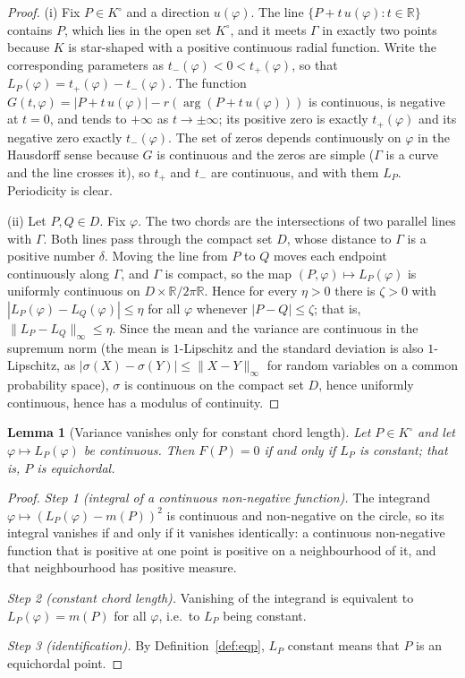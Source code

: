 \documentclass[11pt]{article}
\newcommand{\R}{\mathbb{R}}
\newtheorem{lemma}[theorem]{Lemma}
\theoremstyle{definition}
\theoremstyle{remark}
\begin{document}
\begin{proof}
(i) Fix $P\in K^\circ$ and a direction $u(\varphi)$. The line $\{P+t\,u(\varphi):t\in\R\}$ contains $P$, which lies
in the open set $K^\circ$, and it meets $\Gamma$ in exactly two points because $K$ is star-shaped with a positive
continuous radial function. Write the corresponding parameters as $t_-(\varphi)<0<t_+(\varphi)$, so that
$L_P(\varphi)=t_+(\varphi)-t_-(\varphi)$. The function $G(t,\varphi)=|P+t\,u(\varphi)|-r(\arg(P+t\,u(\varphi)))$ is
continuous, is negative at $t=0$, and tends to $+\infty$ as $t\to\pm\infty$; its positive zero is exactly
$t_+(\varphi)$ and its negative zero exactly $t_-(\varphi)$. The set of zeros depends continuously on $\varphi$ in
the Hausdorff sense because $G$ is continuous and the zeros are simple ($\Gamma$ is a curve and the line crosses
it), so $t_+$ and $t_-$ are continuous, and with them $L_P$. Periodicity is clear.

(ii) Let $P,Q\in D$. Fix $\varphi$. The two chords are the intersections of two parallel lines with $\Gamma$. Both
lines pass through the compact set $D$, whose distance to $\Gamma$ is a positive number $\delta$. Moving the line
from $P$ to $Q$ moves each endpoint continuously along $\Gamma$, and $\Gamma$ is compact, so the map
$(P,\varphi)\mapsto L_P(\varphi)$ is uniformly continuous on $D\times\R/2\pi\R$. Hence for every $\eta>0$ there is
$\zeta>0$ with $|L_P(\varphi)-L_Q(\varphi)|\le\eta$ for all $\varphi$ whenever $|P-Q|\le\zeta$; that is,
$\|L_P-L_Q\|_\infty\le\eta$. Since the mean and the variance are continuous in the supremum norm (the mean is
$1$-Lipschitz and the standard deviation is also $1$-Lipschitz, as $|\sigma(X)-\sigma(Y)|\le\|X-Y\|_\infty$ for
random variables on a common probability space), $\sigma$ is continuous on the compact set $D$, hence uniformly
continuous, hence has a modulus of continuity.
\end{proof}

\begin{lemma}[Variance vanishes only for constant chord length]\label{lem:zero-var}
Let $P\in K^\circ$ and let $\varphi\mapsto L_P(\varphi)$ be continuous. Then $F(P)=0$ if and only if $L_P$ is
constant; that is, $P$ is equichordal.
\end{lemma}

\begin{proof}
\emph{Step 1 (integral of a continuous non-negative function).} The integrand $\varphi\mapsto(L_P(\varphi)-m(P))^2$ is
continuous and non-negative on the circle, so its integral vanishes if and only if it vanishes identically: a
continuous non-negative function that is positive at one point is positive on a neighbourhood of it, and that
neighbourhood has positive measure.

\emph{Step 2 (constant chord length).} Vanishing of the integrand is equivalent to $L_P(\varphi)=m(P)$ for all
$\varphi$, i.e.\ to $L_P$ being constant.

\emph{Step 3 (identification).} By Definition~\ref{def:eqp}, $L_P$ constant means that $P$ is an equichordal point.
\end{proof}
\end{document}
